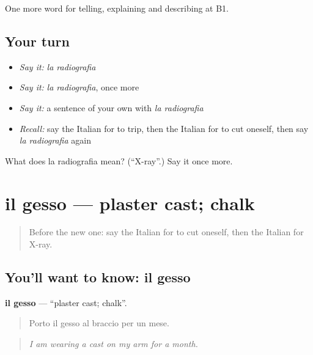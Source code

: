 \begin{grammarlens}[title={What you've built}]
One more word for telling, explaining and describing at B1.
\end{grammarlens}

\subsection*{Your turn}
\begin{itemize}
\raggedright
  \item \emph{Say it:} \emph{la radiografia}
  \item \emph{Say it:} \emph{la radiografia}, once more
  \item \emph{Say it:} a sentence of your own with \emph{la radiografia}
  \item \emph{Recall:} say the Italian for to trip, then the Italian for to cut oneself, then say \emph{la radiografia} again
\end{itemize}

\begin{tcolorbox}[breakable,colback=teal!4,colframe=teal!35!black,title={Before you move on}]
What does la radiografia mean? (\textquotedblleft{}X-ray\textquotedblright{}.) Say it once more.
\end{tcolorbox}
\section[il gesso]{il gesso — plaster cast; chalk}

\label{lesson:IT-C484-gesso}



\begin{quote}
Before the new one: say the Italian for to cut oneself, then the Italian for X-ray.
\end{quote}

\subsection*{You'll want to know: il gesso}
\textbf{il gesso} — \textquotedblleft{}plaster cast; chalk\textquotedblright{}.

\begin{quote}
Porto il gesso al braccio per un mese.
\end{quote}

\begin{quote}
\emph{I am wearing a cast on my arm for a month.}
\end{quote}

